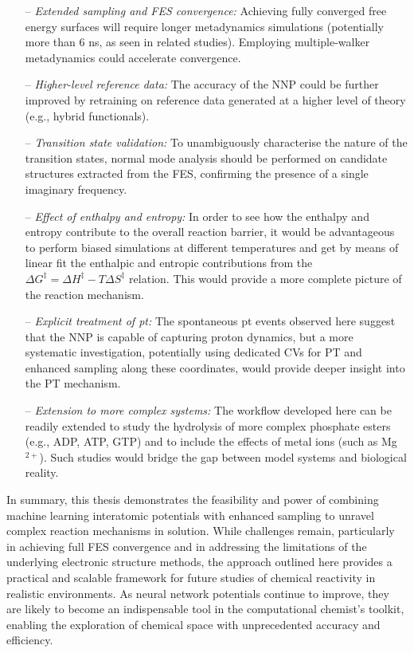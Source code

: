 \begin{itemize}
    \item[--] \textit{Extended sampling and FES convergence:} Achieving fully converged free energy surfaces will require longer metadynamics simulations (potentially more than 6 ns, as seen in related studies). Employing multiple-walker metadynamics could accelerate convergence.
    
    \item[--] \textit{Higher-level reference data:} The accuracy of the NNP could be further improved by retraining on reference data generated at a higher level of theory (e.g., hybrid functionals).
    
    \item[--] \textit{Transition state validation:} To unambiguously characterise the nature of the transition states, normal mode analysis should be performed on candidate structures extracted from the FES, confirming the presence of a single imaginary frequency.
      
    \item[--] \textit{Effect of enthalpy and entropy:} In order to see how the enthalpy and entropy contribute to the overall reaction barrier, it would be advantageous to perform biased simulations at different temperatures and get by means of linear fit the enthalpic and entropic contributions from the $\Delta G^{\ddagger} = \Delta H^{\ddagger} - T \Delta S^{\ddagger}$ relation. This would provide a more complete picture of the reaction mechanism.
   
    \item[--] \textit{Explicit treatment of \ac{pt}:} The spontaneous \ac{pt} events observed here suggest that the NNP is capable of capturing proton dynamics, but a more systematic investigation, potentially using dedicated CVs for PT and enhanced sampling along these coordinates, would provide deeper insight into the PT mechanism.
    
    \item[--] \textit{Extension to more complex systems:} The workflow developed here can be readily extended to study the hydrolysis of more complex phosphate esters (e.g., ADP, ATP, GTP) and to include the effects of metal ions (such as Mg$^{2+}$). Such studies would bridge the gap between model systems and biological reality.
\end{itemize}

In summary, this thesis demonstrates the feasibility and power of combining machine learning interatomic potentials with enhanced sampling to unravel complex reaction mechanisms in solution. While challenges remain, particularly in achieving full FES convergence and in addressing the limitations of the underlying electronic structure methods, the approach outlined here provides a practical and scalable framework for future studies of chemical reactivity in realistic environments. As neural network potentials continue to improve, they are likely to become an indispensable tool in the computational chemist's toolkit, enabling the exploration of chemical space with unprecedented accuracy and efficiency.